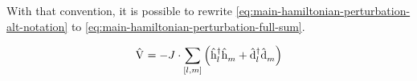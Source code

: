 With that convention, it is possible to rewrite \autoref{eq:main-hamiltonian-perturbation-alt-notation} to \autoref{eq:main-hamiltonian-perturbation-full-sum}.

\begin{equation}
    \label{eq:main-hamiltonian-perturbation-full-sum}
    \begin{split}
        \Vhamiltonian =  - J \cdot \fullneighborsum{l}{m} \left(\hop[]{l}{\dagger}\hop[]{m}{} + \dop[]{l}{\dagger}\dop[]{m}{} \right)
    \end{split}
\end{equation}
